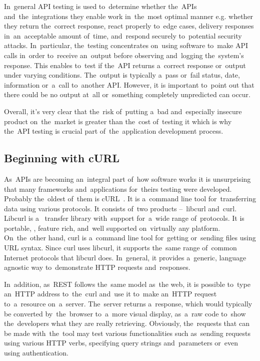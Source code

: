 In~general API testing is used to~determine whether the~APIs
and~the~integrations they enable work in~the~most optimal manner e.g. whether
they return the~correct response, react properly to~edge cases, delivery
responses in~an~acceptable amount of~time, and~respond securely to~potential
security attacks. In~particular, the~testing concentrates on~using software
to~make API calls in~order to~receive an~output before observing and~logging
the~system's response. This enables to~test if the~API returns a~correct
response or~output under varying conditions. The~output is typically a~pass
or~fail status, date, information or~a~call to~another API. However, it is
important to~point out that there could be no output at~all or~something
completely unpredicted can occur.

Overall, it's very clear that the~risk of~putting a~bad and~especially insecure
product on~the~market is greater than the~cost of~testing it which is why the~API
testing is crucial part of~the~application development process.



\subsection{Beginning with cURL}
As~APIs are becoming an~integral part of~how software works it is unsurprising
that many frameworks and~applications for~theirs testing were
developed. Probably the~oldest of~them is cURL~\cite{cURL}. It is a~command line
tool for~transferring data using various protocols. It consists of~two products
--~libcurl and~curl. Libcurl is a~ transfer library with~support
for~a~wide range of~protocols. It is portable, , feature rich,
and~well supported on~virtually any platform. On~the~other hand, curl is
a~command line tool for~getting or~sending files using URL syntax. Since curl
uses libcurl, it supports the~same range of~common Internet protocols that
libcurl does. In~general, it provides a~generic, language agnostic way
to~demonstrate HTTP requests and~responses.

In~addition, as~REST follows the~same model as~the web, it is possible to~type
an~HTTP address to~the~curl and~use it to~make an~HTTP request to~a~resource
on~a~server. The~server returns a~response, which would typically be converted
by~the~browser to~a~more visual display, as~a~raw code to~show the~developers
what they are really retrieving. Obviously, the~requests that can be made
with~the~tool may test various functionalities such as~sending requests using
various HTTP verbs, specifying query strings and~parameters or~even using
authentication.

